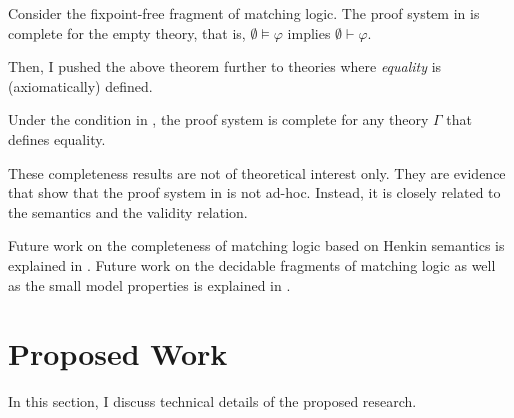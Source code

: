 \documentclass[11pt]{article}
\begin{document}
\begin{theorem}
\label{thm:completeness-local}
Consider the fixpoint-free fragment of matching logic. 
The proof system in  is complete for the empty theory, that is,
$\emptyset \vDash \varphi$ implies $\emptyset \vdash \varphi$. 
\end{theorem}

Then, I pushed the above theorem further to theories where \emph{equality} is 
(axiomatically) defined. 

\begin{theorem}
\label{thm:completeness-defined}
Under the condition in , the proof system is 
complete for any theory $\Gamma$ that defines equality.
\end{theorem}

These completeness results are not of theoretical interest only. 
They are evidence that show that the proof system in 
 is not ad-hoc. Instead, it is closely related to the semantics 
and the validity relation. 

Future work on the completeness of matching logic based on Henkin semantics 
is explained in 
. 
Future work on the decidable fragments of matching logic as well as the small model properties is explained in .


\section{Proposed Work}
\label{sec:proposed}

In this section, I discuss technical details of the proposed research. 

%
%
%
%
%
%
\end{document}
